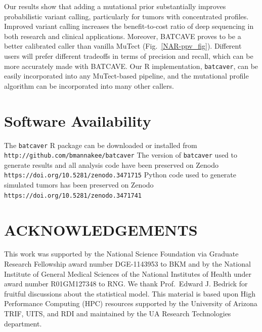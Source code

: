 \documentclass[a4,center,fleqn]{NAR}
\newcommand{\batcave}{BATCAVE\xspace}
\begin{document}
Our results show that adding a mutational prior substantially improves probabilistic variant calling, particularly for tumors with concentrated profiles.
Improved variant calling increases the benefit-to-cost ratio of deep sequencing in both research and clinical applications.
Moreover, \batcave proves to be a better calibrated caller than vanilla MuTect (Fig.~\ref{NAR-ppv_fig}).
Different users will prefer different tradeoffs in terms of precision and recall, which can be more accurately made with \batcave.
Our R implementation, \texttt{batcaver}, can be easily incorporated into any MuTect-based pipeline, and the mutational profile algorithm can be incorporated into many other callers.

\section{Software Availability}

The \texttt{batcaver} R package can be downloaded or installed from \texttt{http://github.com/bmannakee/batcaver}
The version of \texttt{batcaver} used to generate results and all analysis code have been preserved on Zenodo \texttt{https://doi.org/10.5281/zenodo.3471715}
Python code used to generate simulated tumors has been preserved on Zenodo \texttt{https://doi.org/10.5281/zenodo.3471741}





\section{ACKNOWLEDGEMENTS}

This work was supported by the National Science Foundation via Graduate Research Fellowship award number DGE-1143953 to BKM and by the National Institute of General Medical Sciences of the National Institutes of Health under award number R01GM127348 to RNG.
We thank Prof.\ Edward J. Bedrick for fruitful discussions about the statistical model.
This material is based upon High Performance Computing (HPC) resources supported by the University of Arizona TRIF, UITS, and RDI and maintained by the UA Research Technologies department.
\end{document}

